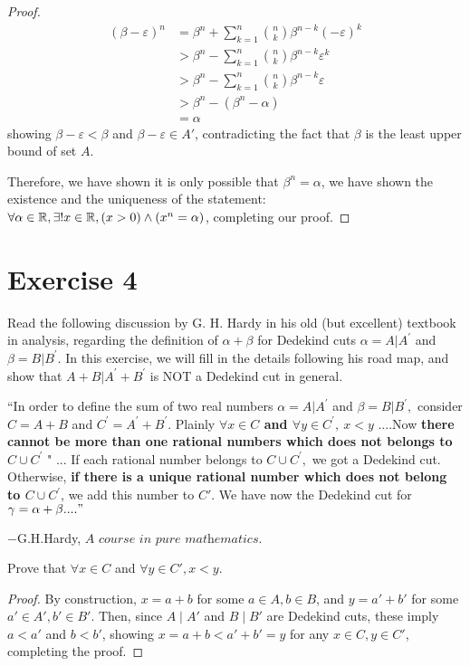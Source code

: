 \documentclass{homework}
\newcommand{\R}{\bb{R}} %
\newcommand{\?}{\stackrel{?}{=}}
\newcommand{\ep}{\varepsilon}
\theoremstyle{definition}
\begin{document}
\begin{proof}
    \begin{align*}
        (\beta-\ep)^n &= \beta^n + \sum_{k=1}^n\binom{n}{k}\beta^{n-k}(-\ep)^k\\
        &> \beta^n - \sum_{k=1}^n\binom{n}{k}\beta^{n-k}\ep^k\\
        &> \beta^n - \sum_{k=1}^n\binom{n}{k}\beta^{n-k}\ep\\
        &> \beta^n -  (\beta^n - \alpha)\\
        &=\alpha
    \end{align*}
    showing $\beta-\ep<\beta$ and $\beta-\ep\in A'$, contradicting the fact that $\beta$ is the least upper bound of set $A$. 

    Therefore, we have shown it is only possible that $\beta^n=\alpha$, we have shown the existence and the uniqueness of the statement: $\forall \alpha\in\R, \exists !x\in\R, (x>0)\land(x^n=\alpha)$, completing our proof. 
\end{proof}


\newpage
\section*{Exercise 4}

Read the following discussion by G. H. Hardy in his old (but excellent) textbook in analysis, regarding the definition of $\alpha+\beta$ for Dedekind cuts $\alpha= A|A^{\prime}$ and $\beta= B|B^{\prime}.$ In this exercise, we will fill in the details following his road map, and show that $A+B|A^{\prime}+B^{\prime}$ is NOT a Dedekind cut in general.

“In order to define the sum of two real numbers $\alpha= A|A^{\prime}$ and $\beta= B|B^{\prime}, $ consider $C= A+ B$ and $C^{\prime}= A^{\prime}+ B^{\prime}.$ Plainly \textbf{$\forall x\in C$ and $\forall y\in C^{\prime},\:x<y$ }....Now \textbf{there cannot be more than one rational numbers which does not belongs to $C\cup C^{\prime}$ }" ... If each rational number belongs to $C\cup C^{\prime},$ we got a Dedekind cut. Otherwise, \textbf{if there is a unique rational number which does not belong to $C\cup C^{\prime}$}, we add this number to $C'$. We have now the Dedekind cut for $\gamma=\alpha+\beta...."$

$- $G.H.Hardy, $\textit{A course in pure mathematics.}$

\question[1] Prove that $\forall x\in C$ and $\forall y\in C', x<y$. 

\begin{proof}
    By construction, $x=a+b$ for some $a\in A, b\in B$, and $y=a'+b'$ for some $a'\in A', b'\in B'$. Then, since $A\mid A'$ and $B\mid B'$ are Dedekind cuts, these imply $a<a'$ and $b<b'$, showing $x=a+b<a'+b'=y$ for any $x\in C, y\in C'$, completing the proof. 
\end{proof}
\end{document}
